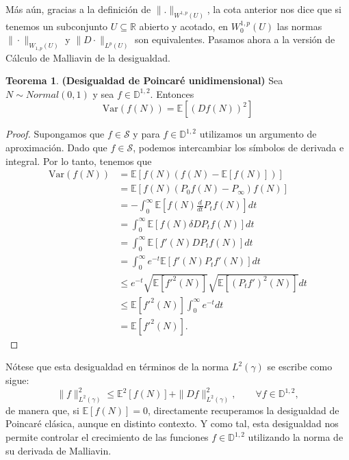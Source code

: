 \documentclass[letterpaper,twoside,12pt]{book}
\newcommand{\R}{\mathbb{R}}
\newcommand{\D}{\mathbb{D}}
\renewcommand{\S}{\mathcal{S}}
\newcommand{\E}{\mathbb{E}}
\newcommand{\1}{\mathds{1}}
\theoremstyle{definition}
\theoremstyle{definition}
\newtheorem{teo}{Teorema}
\theoremstyle{remark}
\theoremstyle{definition}
\theoremstyle{definition}
\theoremstyle{definition}
\theoremstyle{definition}
\theoremstyle{definition}
\begin{document}
   Más aún, gracias a la definición de $\|.\|_{W^{1,p}(U)}$, la cota anterior nos dice que si tenemos un subconjunto $U\subseteq \R$ abierto y acotado, en $W_0^{1,p}(U)$ las normas $\|\cdot\|_{W_{1,p}(U)}$ y $\|D\cdot\|_{L^p(U)}$ son equivalentes. Pasamos ahora a la versión de Cálculo de Malliavin de la desigualdad.
   \begin{teo} \textbf{(Desigualdad de Poincaré unidimensional)} Sea $N\sim Normal(0,1)$ y sea $f\in \D^{1,2}$. Entonces
       \[
       \text{Var}\left(f(N)\right)=\E\left[(Df(N))^2\right]    
       \]     
    \end{teo}
    \begin{proof} 
        Supongamos que $f\in \S$ y para $f\in \D^{1,2}$ utilizamos un argumento de aproximación. Dado que $f\in \S$, podemos intercambiar los símbolos de derivada e integral. Por lo tanto, tenemos que 
        \begin{align*}
            \text{Var}\left(f(N)\right)&=\E\left[f(N)(f(N)-\E\left[f(N)\right])\right]\\
            &=\E\left[f(N)(P_0f(N)-P_\infty)f(N)\right]\\
            &=-\int_{0}^{\infty}\E\left[f(N)\frac{d}{dt}P_tf(N)\right]dt\\
            &=\int_{0}^{\infty}\E\left[f(N)\delta DP_tf(N)\right]dt\\
            &=\int_{0}^{\infty}\E\left[f'(N)DP_tf(N)\right]dt\\
            &=\int_{0}^{\infty}e^{-t}\E\left[f'(N)P_tf'(N)\right]dt\\
            &\leq e^{-t}\sqrt{\E\left[f'^2(N)\right]}\sqrt{\E\left[(P_tf')^2(N)\right]}dt\\
            &\leq \E\left[f'^2(N)\right]\int_{0}^{\infty}e^{-t}dt\\
            &=\E\left[f'^2(N)\right].
        \end{align*} 
     \end{proof}
Nótese que esta desigualdad en términos de la norma $L^2(\gamma)$ se escribe como sigue:
\[
\|f\|^2_{L^2(\gamma)}\leq \E^2\left[f(N)\right]+\|Df\|^2_{L^2(\gamma)}, \qquad \forall f\in \D^{1,2},
\]
de manera que, si $\E\left[f(N)\right]=0$, directamente recuperamos la desigualdad de Poincaré clásica, aunque en distinto contexto. Y como tal, esta desigualdad nos permite controlar el crecimiento de las funciones $f\in \D^{1,2}$ utilizando la norma de su derivada de Malliavin.
\end{document}
